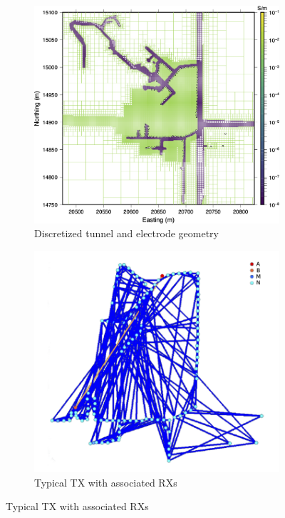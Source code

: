\documentclass[final,authoryear,5p,times,twocolumn]{elsarticle}
\begin{document}
\begin{figure}[!ht]
   \centering
   \begin{subfigure}[b]{0.95\linewidth}
       \centering
       \includegraphics[trim=0cm 0cm 0cm 0cm, clip=true, width=\linewidth]{./Figures/Fig2a.png}
       \caption{Discretized tunnel and electrode geometry}
       \label{fig:DataQC_OctreeMesh_ElecGeom}
   \end{subfigure}

   \vspace{1em} %

   \begin{subfigure}[b]{0.75\linewidth}
       \centering
       \includegraphics[trim=0cm 0cm 0cm 0cm, clip=true, width=\linewidth]{./Figures/Fig2b.png}
       \caption{Typical TX with associated RXs}
       \label{fig:DataQC_TypicalTx}
   \end{subfigure}


\end{figure}
\end{document}
